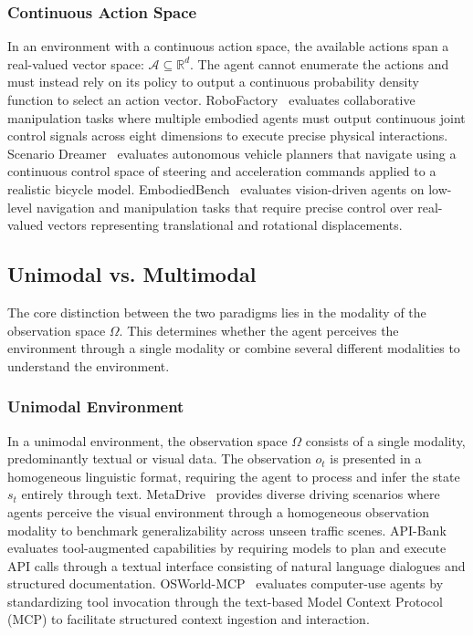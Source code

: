 \documentclass{llmxive}
\begin{document}
\subsubsection{Continuous Action Space}
In an environment with a continuous action space, the available actions span a real-valued vector space: $\mathcal{A} \subseteq \mathbb{R}^d$. The agent cannot enumerate the actions and must instead rely on its policy to output a continuous probability density function to select an action vector. RoboFactory~\cite{RoboFactory} evaluates collaborative manipulation tasks where multiple embodied agents must output continuous joint control signals across eight dimensions to execute precise physical interactions. Scenario Dreamer~\cite{Scenario_Dreamer} evaluates autonomous vehicle planners that navigate using a continuous control space of steering and acceleration commands applied to a realistic bicycle model. EmbodiedBench~\cite{EmbodiedBench} evaluates vision-driven agents on low-level navigation and manipulation tasks that require precise control over real-valued vectors representing translational and rotational displacements.





\subsection{Unimodal vs. Multimodal}
\label{attribute:Unimodal vs. Multimodal}
The core distinction between the two paradigms lies in the modality of the observation space $\Omega$. This determines whether the agent perceives the environment through a single modality or combine several different modalities to understand the environment.

\subsubsection{Unimodal Environment}
In a unimodal environment, the observation space $\Omega$ consists of a single modality, predominantly textual or visual data. The observation $o_t$ is presented in a homogeneous linguistic format, requiring the agent to process and infer the state $s_t$ entirely through text. MetaDrive~\cite{MetaDrive} provides diverse driving scenarios where agents perceive the visual environment through a homogeneous observation modality to benchmark generalizability across unseen traffic scenes. API-Bank~\cite{API-Bank} evaluates tool-augmented capabilities by requiring models to plan and execute API calls through a textual interface consisting of natural language dialogues and structured documentation. OSWorld-MCP~\cite{OSWorld-MCP} evaluates computer-use agents by standardizing tool invocation through the text-based Model Context Protocol (MCP) to facilitate structured context ingestion and interaction.
\end{document}
